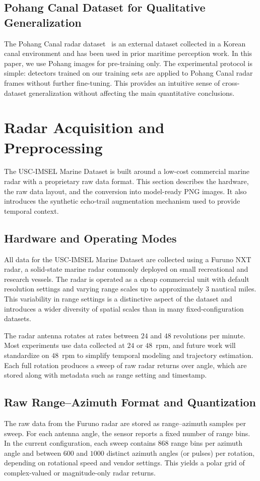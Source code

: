 \documentclass[twocolumn, 10pt]{article}
\begin{document}
\subsection{Pohang Canal Dataset for Qualitative Generalization}
The Pohang Canal radar dataset~\cite{chung2023pohang_canal_dataset} is an external dataset collected in a Korean canal environment and has been used in prior maritime perception work. In this paper, we use Pohang images for pre-training only. The experimental protocol is simple: detectors trained on our training sets are applied to Pohang Canal radar frames without further fine-tuning. This provides an intuitive sense of cross-dataset generalization without affecting the main quantitative conclusions.


\section{Radar Acquisition and Preprocessing}
\label{sec:acq}
The USC-IMSEL Marine Dataset is built around a low-cost commercial marine radar with a proprietary raw data format. This section describes the hardware, the raw data layout, and the conversion into model-ready PNG images. It also introduces the synthetic echo-trail augmentation mechanism used to provide temporal context.

\subsection{Hardware and Operating Modes}
All data for the USC-IMSEL Marine Dataset are collected using a Furuno NXT radar, a solid-state marine radar commonly deployed on small recreational and research vessels. The radar is operated as a cheap commercial unit with default resolution settings and varying range scales up to approximately $3$ nautical miles. This variability in range settings is a distinctive aspect of the dataset and introduces a wider diversity of spatial scales than in many fixed-configuration datasets.

The radar antenna rotates at rates between $24$ and $48$ revolutions per minute. Most experiments use data collected at $24$ or $48$~rpm, and future work will standardize on $48$~rpm to simplify temporal modeling and trajectory estimation. Each full rotation produces a sweep of raw radar returns over angle, which are stored along with metadata such as range setting and timestamp.

\subsection{Raw Range--Azimuth Format and Quantization}
The raw data from the Furuno radar are stored as range--azimuth samples per sweep. For each antenna angle, the sensor reports a fixed number of range bins. In the current configuration, each sweep contains $868$ range bins per azimuth angle and between $600$ and $1000$ distinct azimuth angles (or pulses) per rotation, depending on rotational speed and vendor settings. This yields a polar grid of complex-valued or magnitude-only radar returns.
\end{document}
